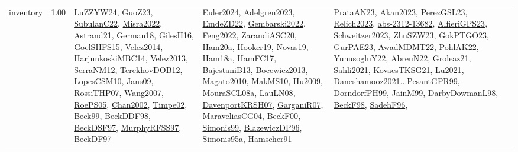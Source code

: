 {\begin{longtable}{p{3cm}r>{\raggedright\arraybackslash}p{6cm}>{\raggedright\arraybackslash}p{6cm}>{\raggedright\arraybackslash}p{8cm}}
\index{inventory}\index{Concepts!inventory}inventory &  1.00 & \hyperref[detail:LuZZYW24]{LuZZYW24}, \hyperref[detail:GuoZ23]{GuoZ23}, \hyperref[detail:SubulanC22]{SubulanC22}, \hyperref[detail:Misra2022]{Misra2022}, \hyperref[detail:Astrand21]{Astrand21}, \hyperref[detail:German18]{German18}, \hyperref[detail:GilesH16]{GilesH16}, \hyperref[detail:GoelSHFS15]{GoelSHFS15}, \hyperref[detail:Velez2014]{Velez2014}, \hyperref[detail:HarjunkoskiMBC14]{HarjunkoskiMBC14}, \hyperref[detail:Velez2013]{Velez2013}, \hyperref[detail:SerraNM12]{SerraNM12}, \hyperref[detail:TerekhovDOB12]{TerekhovDOB12}, \hyperref[detail:LopesCSM10]{LopesCSM10}, \hyperref[detail:Jans09]{Jans09}, \hyperref[detail:RossiTHP07]{RossiTHP07}, \hyperref[detail:Wang2007]{Wang2007}, \hyperref[detail:RoePS05]{RoePS05}, \hyperref[detail:Chan2002]{Chan2002}, \hyperref[detail:Timpe02]{Timpe02}, \hyperref[detail:Beck99]{Beck99}, \hyperref[detail:BeckDDF98]{BeckDDF98}, \hyperref[detail:BeckDSF97]{BeckDSF97}, \hyperref[detail:MurphyRFSS97]{MurphyRFSS97}, \hyperref[detail:BeckDF97]{BeckDF97} & \hyperref[detail:Euler2024]{Euler2024}, \hyperref[detail:Adelgren2023]{Adelgren2023}, \hyperref[detail:EmdeZD22]{EmdeZD22}, \hyperref[detail:Gembarski2022]{Gembarski2022}, \hyperref[detail:Feng2022]{Feng2022}, \hyperref[detail:ZarandiASC20]{ZarandiASC20}, \hyperref[detail:Ham20a]{Ham20a}, \hyperref[detail:Hooker19]{Hooker19}, \hyperref[detail:Novas19]{Novas19}, \hyperref[detail:Ham18a]{Ham18a}, \hyperref[detail:HamFC17]{HamFC17}, \hyperref[detail:BajestaniB13]{BajestaniB13}, \hyperref[detail:Bocewicz2013]{Bocewicz2013}, \hyperref[detail:Magato2010]{Magato2010}, \hyperref[detail:MakMS10]{MakMS10}, \hyperref[detail:Hu2009]{Hu2009}, \hyperref[detail:MouraSCL08a]{MouraSCL08a}, \hyperref[detail:LauLN08]{LauLN08}, \hyperref[detail:DavenportKRSH07]{DavenportKRSH07}, \hyperref[detail:GarganiR07]{GarganiR07}, \hyperref[detail:MaraveliasCG04]{MaraveliasCG04}, \hyperref[detail:BeckF00]{BeckF00}, \hyperref[detail:Simonis99]{Simonis99}, \hyperref[detail:BlazewiczDP96]{BlazewiczDP96}, \hyperref[detail:Simonis95a]{Simonis95a}, \hyperref[detail:Hamscher91]{Hamscher91} & \hyperref[detail:PrataAN23]{PrataAN23}, \hyperref[detail:Akan2023]{Akan2023}, \hyperref[detail:PerezGSL23]{PerezGSL23}, \hyperref[detail:Relich2023]{Relich2023}, \hyperref[detail:abs-2312-13682]{abs-2312-13682}, \hyperref[detail:AlfieriGPS23]{AlfieriGPS23}, \hyperref[detail:Schweitzer2023]{Schweitzer2023}, \hyperref[detail:ZhuSZW23]{ZhuSZW23}, \hyperref[detail:GokPTGO23]{GokPTGO23}, \hyperref[detail:GurPAE23]{GurPAE23}, \hyperref[detail:AwadMDMT22]{AwadMDMT22}, \hyperref[detail:PohlAK22]{PohlAK22}, \hyperref[detail:YunusogluY22]{YunusogluY22}, \hyperref[detail:AbreuN22]{AbreuN22}, \hyperref[detail:Groleaz21]{Groleaz21}, \hyperref[detail:Sahli2021]{Sahli2021}, \hyperref[detail:KovacsTKSG21]{KovacsTKSG21}, \hyperref[detail:Lu2021]{Lu2021}, \hyperref[detail:Daneshamooz2021]{Daneshamooz2021}...\hyperref[detail:PesantGPR99]{PesantGPR99}, \hyperref[detail:DorndorfPH99]{DorndorfPH99}, \hyperref[detail:JainM99]{JainM99}, \hyperref[detail:DarbyDowmanL98]{DarbyDowmanL98}, \hyperref[detail:BeckF98]{BeckF98}, \hyperref[detail:SadehF96]{SadehF96}, 
\end{longtable}}
